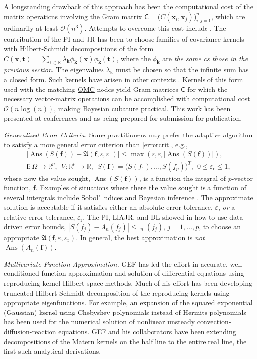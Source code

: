 \documentclass[11pt]{NSFamsart}
\newcommand{\QMC}{\hyperlink{QMClink}{QMC}\xspace}
\newcommand{\reals}{{\mathbb{R}}}
\newcommand{\vf}{\boldsymbol{f}}
\newcommand{\mC}{\mathsf{C}}
\newcommand{\bbK}{\mathbb{K}}
\DeclareMathOperator{\err}{err}
\DeclareMathOperator{\herr}{\widehat{\err}}
\DeclareMathOperator{\Ans}{Ans}
\newcommand{\bx}{{\boldsymbol{x}}}
\newcommand{\bk}{{\boldsymbol{k}}}
\newcommand{\bt}{{\boldsymbol{t}}}
\newcommand{\fA}{\mathfrak{A}}
\def\abs#1{\ensuremath{\left \lvert #1 \right \rvert}}
\newcommand{\Order}{\mathcal{O}}
\newcommand{\reltol}{\varepsilon_{\text{r}}}
\begin{document}
A longstanding drawback of this approach has been the computational cost of the matrix operations 
involving the Gram matrix $\mC = \bigl(C(\bx_i,\bx_j)\bigr)_{i,j=1}^n$, which are ordinarily at least 
$\Order(n^3)$.  Attempts to overcome this cost include \cite{AniCheSte16a, ParEtal17a}.  The 
contribution of the PI and JR has been to choose families of covariance kernels with Hilbert-Schmidt 
decompositions of the form $C(\bx,\bt) = \sum_{\bk \in \bbK} \lambda_\bk \phi_{\bk}(\bx) 
\phi_{\bk}(\bt)$, where the $\phi_{\bk}$ are \emph{the same as those in the previous section}.  The 
eigenvalues $\lambda_\bk$ must be chosen so that the infinite sum has a closed form.  Such 
kernels have arisen in other contexts \cite{Hic99b,HicYue00}.  Kernels of 
this form used with the matching \QMC nodes yield Gram matrices $\mC$ for which the 
necessary vector-matrix operations can be accomplished with computational cost $\Order(n 
\log(n))$, making Bayesian cubature practical.  This work has been presented at conferences and 
as being prepared for submission for publication.

\emph{Generalized Error Criteria.}  Some practitioners may prefer the adaptive 
algorithm 
to satisfy a more general error 
criterion than \eqref{errorcrit}, e.g., 
\begin{multline}
\label{generrorcrit} \tag{G-CRIT}
\abs{\Ans(S(\vf)) - \fA(\vf,\varepsilon, \reltol) } \le \max(\varepsilon, \reltol \abs{\Ans(S(\vf))} ),  \\
 \vf: 
\Omega \to \reals^p, \ \ V: \reals^p \to \reals, \ \ S(\vf) = \bigl(S(f_1), \ldots, S(f_p) \bigr)^T, \ \  0 \le 
\reltol \le 1,
\end{multline}
where now the value sought, $\Ans(S(\vf))$, is a function the integral of $p$-vector function, 
$\vf$. Examples of situations where there the value sought is a function of several intergrals include 
Sobol' indices \cite{Sal02a} and Bayesian inference \cite{GelEtal13}.  The approximate solution is 
acceptable if it 
satisfies either an absolute error tolerance, 
$\varepsilon$, \emph{or} a relative error tolerance, $\reltol$.  The PI, LlAJR, and DL showed in 
\cite{HicEtal17a} how to use data-driven error bounds, $\abs{S(f_j) - A_n(f_j)} \le \herr_{n}(f_j)$, $j = 
1, \ldots, p$,  to 
choose an appropriate $\fA(\vf,\varepsilon, \reltol)$.  In general, the 
best approximation is \emph{not} $\Ans(A_n(\vf))$.  


\emph{Multivariate Function Approximation.}
GEF has led the effort in accurate, well-conditioned function approximation and solution of 
differential equations using reproducing kernel Hilbert space methods.  Much of his effort has been 
developing truncated Hilbert-Schmidt decomposition of the reproducing kernels using appropriate 
eigenfunctions.  For example, an expansion of the squared exponential (Gaussian) kernel using 
Chebyshev polynomials instead of Hermite polynomials has been used for the numerical solution of 
nonlinear unsteady 
convection-diffusion-reaction equations.  GEF and his collaborators have been extending 
decompositions of the Matern kernels on the half line to the entire real line, the first such analytical 
derivations.
\end{document}
